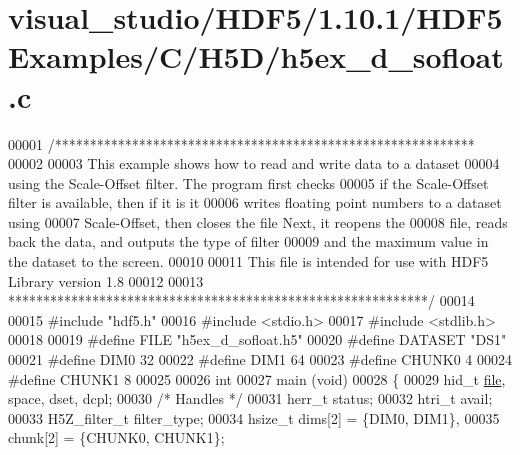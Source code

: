 \hypertarget{visual__studio_2_h_d_f5_21_810_81_2_h_d_f5_examples_2_c_2_h5_d_2h5ex__d__sofloat_8c_source}{}\section{visual\+\_\+studio/\+H\+D\+F5/1.10.1/\+H\+D\+F5\+Examples/\+C/\+H5\+D/h5ex\+\_\+d\+\_\+sofloat.c}
\label{visual__studio_2_h_d_f5_21_810_81_2_h_d_f5_examples_2_c_2_h5_d_2h5ex__d__sofloat_8c_source}

\begin{DoxyCode}
00001 \textcolor{comment}{/************************************************************}
00002 \textcolor{comment}{}
00003 \textcolor{comment}{  This example shows how to read and write data to a dataset}
00004 \textcolor{comment}{  using the Scale-Offset filter.  The program first checks}
00005 \textcolor{comment}{  if the Scale-Offset filter is available, then if it is it}
00006 \textcolor{comment}{  writes floating point numbers to a dataset using}
00007 \textcolor{comment}{  Scale-Offset, then closes the file Next, it reopens the}
00008 \textcolor{comment}{  file, reads back the data, and outputs the type of filter}
00009 \textcolor{comment}{  and the maximum value in the dataset to the screen.}
00010 \textcolor{comment}{}
00011 \textcolor{comment}{  This file is intended for use with HDF5 Library version 1.8}
00012 \textcolor{comment}{}
00013 \textcolor{comment}{ ************************************************************/}
00014 
00015 \textcolor{preprocessor}{#include "hdf5.h"}
00016 \textcolor{preprocessor}{#include <stdio.h>}
00017 \textcolor{preprocessor}{#include <stdlib.h>}
00018 
00019 \textcolor{preprocessor}{#define FILE            "h5ex\_d\_sofloat.h5"}
00020 \textcolor{preprocessor}{#define DATASET         "DS1"}
00021 \textcolor{preprocessor}{#define DIM0            32}
00022 \textcolor{preprocessor}{#define DIM1            64}
00023 \textcolor{preprocessor}{#define CHUNK0          4}
00024 \textcolor{preprocessor}{#define CHUNK1          8}
00025 
00026 \textcolor{keywordtype}{int}
00027 main (\textcolor{keywordtype}{void})
00028 \{
00029     hid\_t           \hyperlink{structfile}{file}, space, dset, dcpl;
00030                                                 \textcolor{comment}{/* Handles */}
00031     herr\_t          status;
00032     htri\_t          avail;
00033     H5Z\_filter\_t    filter\_type;
00034     hsize\_t         dims[2] = \{DIM0, DIM1\},
00035                     chunk[2] = \{CHUNK0, CHUNK1\};

\end{DoxyCode}
